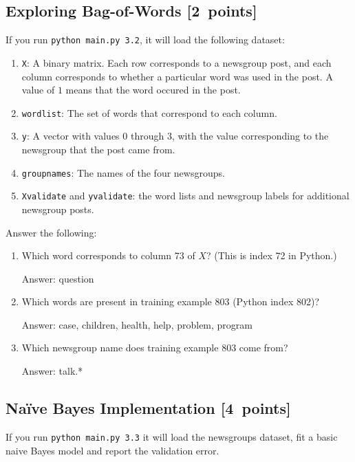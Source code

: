 \documentclass{article}
\newcommand{\blu}[1]{{\textcolor{blu}{#1}}}
\newenvironment{answer}{\par\begingroup\color{gre}Answer: }{\endgroup}
\let\ask\blu
\newcommand\pts[1]{\textcolor{pointscolour}{[#1~points]}}
\begin{document}
    \clearpage
    \subsection{Exploring Bag-of-Words \pts{2}}

    If you run \texttt{python main.py 3.2}, it will load the following dataset:
    \begin{enumerate}
        \item \texttt{X}: A binary matrix. Each row corresponds to a newsgroup post, and each column corresponds to whether a particular word was used in the post. A value of $1$ means that the word occured in the post.
        \item \texttt{wordlist}: The set of words that correspond to each column.
        \item \texttt{y}: A vector with values $0$ through $3$, with the value corresponding to the newsgroup that the post came from.
        \item \texttt{groupnames}: The names of the four newsgroups.
        \item \texttt{Xvalidate} and \texttt{yvalidate}: the word lists and newsgroup labels for additional newsgroup posts.
    \end{enumerate}
    \ask{Answer the following}:
    \begin{enumerate}
        \item Which word corresponds to column 73 of $X$? (This is index 72 in Python.)
        \begin{answer}
        question
        \end{answer}
        \item Which words are present in training example 803 (Python index 802)?
        \begin{answer}
        case, children, health, help, problem, program
        \end{answer}
        \item Which newsgroup name does training example 803 come from?
        \begin{answer}
        talk.*
        \end{answer}
    \end{enumerate}

    \clearpage
    \subsection{Na\"ive Bayes Implementation \pts{4}}

    If you run \texttt{python main.py 3.3}
    it will load the newsgroups dataset, fit a basic naive Bayes model and report the validation error.
\end{document}
